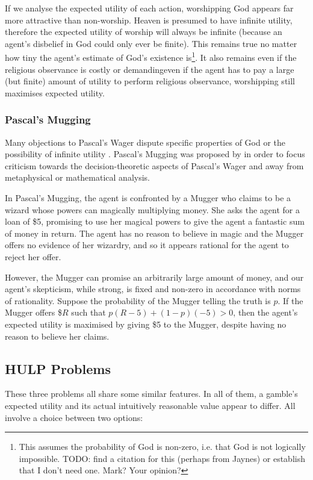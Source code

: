 \documentclass{article}
\begin{document}
If we analyse the expected utility of each action, worshipping God appears far more attractive than non-worship. Heaven is presumed to have infinite utility, therefore the expected utility of worship will always be infinite (because an agent's disbelief in God could only ever be finite). This remains true no matter how tiny the agent's estimate of God's existence is\footnote{This assumes the probability of God is non-zero, i.e. that God is not logically impossible. TODO: find a citation for this (perhaps from Jaynes) or establish that I don't need one. Mark? Your opinion?}. It also remains even if the religious observance is costly or demanding\textemdash even if the agent has to pay a large (but finite) amount of utility to perform religious observance, worshipping still maximises expected utility.

\subsubsection {Pascal's Mugging}
Many objections to Pascal's Wager dispute specific properties of God \citep{mackie1990miracle} or the possibility of infinite utility \citep{mcclennen1994pascal}. Pascal's Mugging was proposed by \citep{bostrom2009pascal} in order to focus criticism towards the decision-theoretic aspects of Pascal's Wager and away from metaphysical or mathematical analysis.

In Pascal's Mugging, the agent is confronted by a Mugger who claims to be a wizard whose powers can magically multiplying money. She asks the agent for a loan of \$5, promising to use her magical powers to give the agent a fantastic sum of money in return. The agent has no reason to believe in magic and the Mugger offers no evidence of her wizardry, and so it appears rational for the agent to reject her offer.

However, the Mugger can promise an arbitrarily large amount of money, and our agent's skepticism, while strong, is fixed and non-zero in accordance with norms of rationality. Suppose the probability of the Mugger telling the truth is \(p\). If the Mugger offers \$\(R\) such that \(p(R-5)+(1-p)(-5)>0\), then the agent's expected utility is maximised by giving \$5 to the Mugger, despite having no reason to believe her claims.

\subsection{HULP Problems}
These three problems all share some similar features. In all of them, a gamble's expected utility and its actual intuitively reasonable value appear to differ. All involve a choice between two options:
\end{document}
